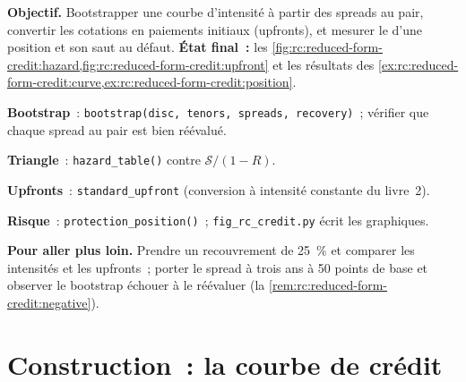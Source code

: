 \begin{tutorial}
\textbf{Objectif.} Bootstrapper une courbe d'intensité à partir des spreads au pair, convertir les cotations en paiements initiaux (upfronts), et
mesurer le  d'une position et son saut au défaut. \textbf{État final~:}
les \cref{fig:rc:reduced-form-credit:hazard,fig:rc:reduced-form-credit:upfront} et les
résultats des \cref{ex:rc:reduced-form-credit:curve,ex:rc:reduced-form-credit:position}.
\begin{tutsteps}
\item \textbf{Bootstrap}~: \texttt{bootstrap(disc, tenors, spreads, recovery)}~; vérifier que chaque
spread au pair est bien réévalué.
\item \textbf{Triangle}~: \texttt{hazard\_table()} contre $\mathcal S/(1-R)$.
\item \textbf{Upfronts}~: \texttt{standard\_upfront} (conversion à intensité constante du livre~2).
\item \textbf{Risque}~: \texttt{protection\_position()}~; \texttt{fig\_rc\_credit.py} écrit les
graphiques.
\end{tutsteps}
\textbf{Pour aller plus loin.} Prendre un recouvrement de 25~\% et comparer les intensités et les upfronts~;
porter le spread à trois ans à 50 points de base et observer le bootstrap échouer à
le réévaluer (la \cref{rem:rc:reduced-form-credit:negative}).
\end{tutorial}

\section{Construction~: la courbe de crédit}\label{bld:rc:reduced-form-credit:cdscurve}

